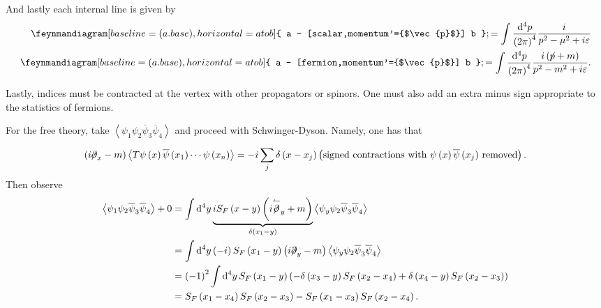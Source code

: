 And lastly each internal line is given by
\begin{align}
    \feynmandiagram [baseline=(a.base), horizontal=a to b] {
a -- [scalar,momentum'={$\vec{p}$}] b 
}; = \int \frac{\dd{^4p}}{\left( 2\pi\right)^4} \frac{i}{p^2 - \mu^2 + i \epsilon} \\
    \feynmandiagram [baseline=(a.base), horizontal=a to b] {
a -- [fermion,momentum'={$\vec{p}$}] b 
}; = \int \frac{\dd{^4p}}{\left( 2\pi\right)^4} \frac{i \left( \fbs{p} + m \right) }{p^2 - m^2 + i \epsilon} 
.\end{align}

Lastly, indices must be contracted at the vertex with other propagators or spinors. One must also add an extra minus sign appropriate to the statistics of fermions.

\begin{example}
    For the free theory, take $\left<\psi_1 \psi_2 \overline{\psi}_3 \overline{\psi}_4 \right>$ and proceed with Schwinger-Dyson. Namely, one has that
    \begin{align}
        \left( i \fbs{\partial}_x - m \right) \left<T \psi \left( x \right) \overline{\psi}\left( x_1 \right) \cdots \psi \left( x_{n} \right)  \right> = -i \sum_{j}^{} \delta \left( x - x_{j} \right)  \left( \text{signed contractions with $\psi \left( x \right) \overline{\psi} \left( x_{j} \right) $ removed}\right) 
    .\end{align}
    Then observe
    \begin{align}
        \left<\psi_1 \psi_2 \overline{\psi}_3 \overline{\psi}_4 \right>+0 &= \int \dd{^{4}y} \underbrace{i S_F \left( x - y \right) \left( i \overset{\leftharpoonup}{\fbs{\partial}}_y + m \right) }_{\delta \left( x_1 - y \right) } \left<\psi_y \psi_2 \overline{\psi}_3 \overline{\psi}_4\right> \\
        &= \int \dd{^{4}y} \left( -i \right) S_F \left( x_1 - y \right) \left( i  \fbs{\partial}_y - m\right) \left<\psi_y \psi_2 \overline{\psi}_3 \overline{\psi}_4\right>  \\
        &= \left( -1 \right)^2 \int \dd{^{4}y} S_F \left( x_1 - y \right) \left( - \delta \left( x_3 - y \right) S_F \left( x_2 - x_4 \right) + \delta \left( x_4 - y \right) S_F \left( x_2 - x_3 \right)  \right)   \\
        &= S_F \left( x_1 - x_4 \right) S_F \left( x_2 - x_3 \right) - S_F \left( x_1 - x_3 \right) S_F \left( x_2 - x_4 \right)  
    .\end{align}
\end{example}

